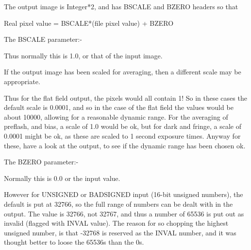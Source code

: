\begin{small}
{{{   The output image is Integer*2, and has BSCALE and BZERO headers so
   that
 
       Real pixel value = BSCALE*(file pixel value)  + BZERO
 
   The BSCALE parameter:-
 
   Thus normally this is 1.0, or that of the input image.
 
   If the output image has been scaled for averaging, then a
   different scale may be appropriate.
 
   Thus for the flat field output, the pixels would all contain 1!
   So in these cases the default scale is 0.0001, and so in the case
   of the flat field the values would be about 10000, allowing for a
   reasonable dynamic range. For the averaging of preflash, and bias,
   a scale of 1.0 would be ok, but for dark and fringe, a scale of
   0.0001 might be ok, as these are scaled to 1 second exposure times.
   Anyway for these, have a look at the output, to see if the dynamic
   range has been chosen ok.
 
   The BZERO parameter:-
 
   Normally this is 0.0 or the input value.
 
   However for UNSIGNED or BADSIGNED input (16-bit unsigned numbers),
   the default is put at 32766, so the full range of numbers can be
   dealt with in the output. The value is 32766, not 32767, and thus
   a number of 65536 is put out as invalid (flagged with INVAL value).
   The reason for so chopping the highest unsigned number, is that
   -32768 is reserved as the INVAL number, and it was thought better
   to loose the 65536s than the 0s.
 
}}}
 
\end{small}
 
 
\newpage
